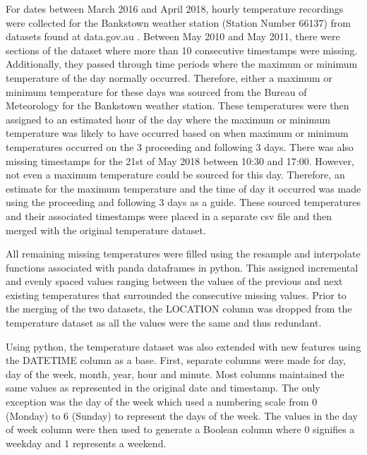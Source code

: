 \documentclass[mstat,12pt]{unswthesis}
\begin{document}
\bigskip

For dates between March 2016 and April 2018, hourly temperature
recordings were collected for the Bankstown weather station (Station
Number 66137) from datasets found at data.gov.au \cite{DATAGOV}. Between
May 2010 and May 2011, there were sections of the dataset where more
than 10 consecutive timestamps were missing. Additionally, they passed
through time periods where the maximum or minimum temperature of the day
normally occurred. Therefore, either a maximum or minimum temperature
for these days was sourced from the Bureau of Meteorology \cite{BOM} for
the Bankstown weather station. These temperatures were then assigned to
an estimated hour of the day where the maximum or minimum temperature
was likely to have occurred based on when maximum or minimum
temperatures occurred on the 3 proceeding and following 3 days. There
was also missing timestamps for the 21st of May 2018 between 10:30 and
17:00. However, not even a maximum temperature could be sourced for this
day. Therefore, an estimate for the maximum temperature and the time of
day it occurred was made using the proceeding and following 3 days as a
guide. These sourced temperatures and their associated timestamps were
placed in a separate csv file and then merged with the original
temperature dataset.

\bigskip

All remaining missing temperatures were filled using the resample and
interpolate functions associated with panda dataframes in python. This
assigned incremental and evenly spaced values ranging between the values
of the previous and next existing temperatures that surrounded the
consecutive missing values. Prior to the merging of the two datasets,
the LOCATION column was dropped from the temperature dataset as all the
values were the same and thus redundant.

\bigskip

Using python, the temperature dataset was also extended with new
features using the DATETIME column as a base. First, separate columns
were made for day, day of the week, month, year, hour and minute. Most
columns maintained the same values as represented in the original date
and timestamp. The only exception was the day of the week which used a
numbering scale from 0 (Monday) to 6 (Sunday) to represent the days of
the week. The values in the day of week column were then used to
generate a Boolean column where 0 signifies a weekday and 1 represents a
weekend.

\bigskip
\end{document}
